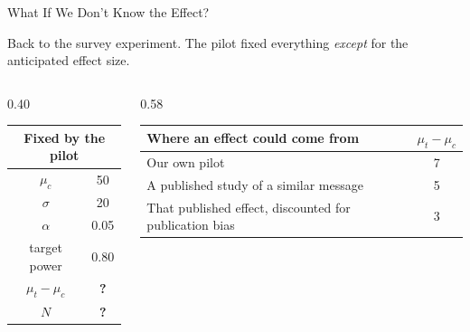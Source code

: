 \documentclass[
  ignorenonframetext,
  aspectratio=169,
]{beamer}
\begin{document}
\begin{frame}{What If We Don't Know the Effect?}
\label{what-if-we-dont-know-the-effect}
\vspace{0.2em}

\small Back to the survey experiment. The pilot fixed everything
\textit{except} for the anticipated effect size.

\vspace{0.5em}

\begin{columns}[T]

\begin{column}{0.40\textwidth}
\begin{center}
\footnotesize
\setlength{\tabcolsep}{6pt}
\renewcommand{\arraystretch}{1.25}
\begin{tabular}{cc}
\toprule
\multicolumn{2}{c}{\textbf{Fixed by the pilot}} \\
\midrule
$\mu_c$        & 50   \\
$\sigma$       & 20   \\
$\alpha$       & 0.05 \\
target power & 0.80 \\
\midrule
$\mu_t - \mu_c$ & \textcolor{statorange}{\textbf{?}} \\
$N$             & \textcolor{statorange}{\textbf{?}} \\
\bottomrule
\end{tabular}
\end{center}
\end{column}

\begin{column}{0.58\textwidth}
\begin{center}
\footnotesize
\setlength{\tabcolsep}{6pt}
\renewcommand{\arraystretch}{1.25}
\begin{tabular}{>{\raggedright\arraybackslash}p{5.6cm}c}
\toprule
\textbf{Where an effect could come from} & $\mu_t - \mu_c$ \\
\midrule
Our own pilot                          & 7 \\
A published study of a similar message & 5 \\
That published effect, discounted for publication bias & 3 \\
\bottomrule
\end{tabular}
\end{center}
\end{column}

\end{columns}

\vspace{0.5em}
\end{frame}
\end{document}
